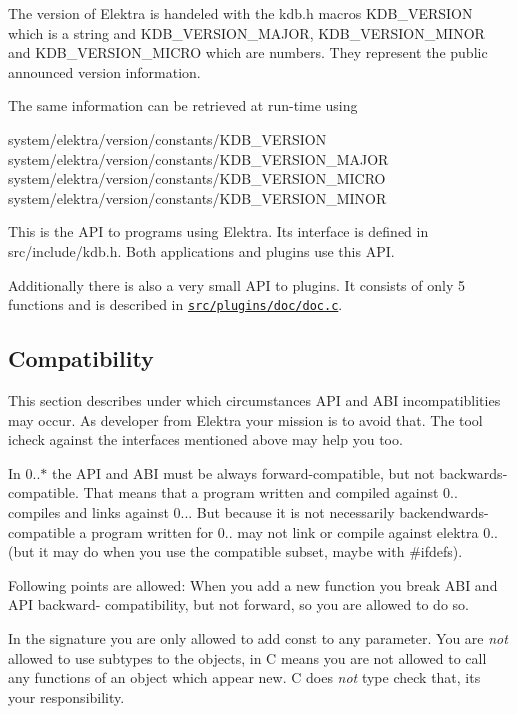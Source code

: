 The version of Elektra is handeled with the kdb.\+h macros {\ttfamily K\+D\+B\+\_\+\+V\+E\+R\+S\+I\+ON} which is a string and {\ttfamily K\+D\+B\+\_\+\+V\+E\+R\+S\+I\+O\+N\+\_\+\+M\+A\+J\+OR}, {\ttfamily K\+D\+B\+\_\+\+V\+E\+R\+S\+I\+O\+N\+\_\+\+M\+I\+N\+OR} and {\ttfamily K\+D\+B\+\_\+\+V\+E\+R\+S\+I\+O\+N\+\_\+\+M\+I\+C\+RO} which are numbers. They represent the public announced version information.

The same information can be retrieved at run-\/time using \begin{DoxyVerb}    system/elektra/version/constants/KDB_VERSION
    system/elektra/version/constants/KDB_VERSION_MAJOR
    system/elektra/version/constants/KDB_VERSION_MICRO
    system/elektra/version/constants/KDB_VERSION_MINOR
\end{DoxyVerb}


This is the A\+PI to programs using Elektra. Its interface is defined in src/include/kdb.h. Both applications and plugins use this A\+PI.

Additionally there is also a very small A\+PI to plugins. It consists of only 5 functions and is described in \href{/home/markus/Projekte/Elektra/current/src/plugins/doc/doc.c}{\tt src/plugins/doc/doc.\+c}.

\subsection*{Compatibility}

This section describes under which circumstances A\+PI and A\+BI incompatiblities may occur. As developer from Elektra your mission is to avoid that. The tool icheck against the interfaces mentioned above may help you too.

In 0..$\ast$ the A\+PI and A\+BI must be always forward-\/compatible, but not backwards-\/compatible. That means that a program written and compiled against 0.. compiles and links against 0... But because it is not necessarily backendwards-\/compatible a program written for 0.. may not link or compile against elektra 0.. (but it may do when you use the compatible subset, maybe with \#ifdefs).

Following points are allowed\+: When you add a new function you break A\+BI and A\+PI backward-\/ compatibility, but not forward, so you are allowed to do so.

In the signature you are only allowed to add const to any parameter. You are {\itshape not} allowed to use subtypes to the objects, in C means you are not allowed to call any functions of an object which appear new. C does {\itshape not} type check that, it\textquotesingle{}s your responsibility.

